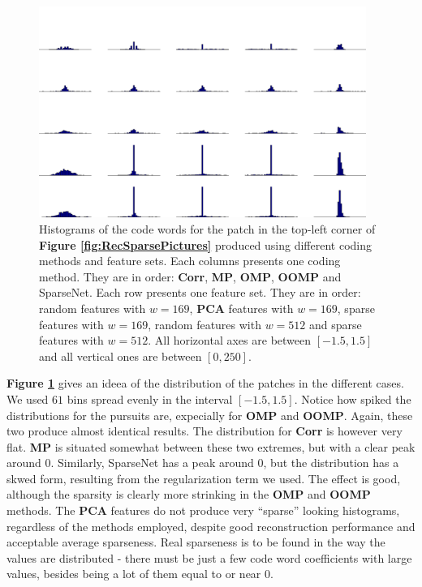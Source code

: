 \documentclass[12pt,a4paper,oneside,english]{UPBThesis}
\begin{document}
\begin{figure}
\centering
\includegraphics[width=0.95\textwidth,height=0.8\textheight]{thesis_data/recsparse/rec_hists.png}
\caption{Histograms of the code words for the patch in the top-left corner of \textbf{Figure \ref{fig:RecSparsePictures}} produced using different coding methods and feature sets. Each columns presents one coding method. They are in order: \textbf{Corr}, \textbf{MP}, \textbf{OMP}, \textbf{OOMP} and SparseNet. Each row presents one feature set. They are in order: random features with $w=169$, \textbf{PCA} features with $w=169$, sparse features with $w=169$, random features with $w=512$ and sparse features with $w=512$. All horizontal axes are between $[-1.5,1.5]$ and all vertical ones are between $[0,250]$.}
\label{fig:RecSparseHists}
\end{figure}

\textbf{Figure \ref{fig:RecSparseHists}} gives an ideea of the distribution of the patches in the different cases. We used $61$ bins spread evenly in the interval $[-1.5,1.5]$. Notice how spiked the distributions for the pursuits are, expecially for \textbf{OMP} and \textbf{OOMP}. Again, these two produce almost identical results. The distribution for \textbf{Corr} is however very flat. \textbf{MP} is situated somewhat between these two extremes, but with a clear peak around $0$. Similarly, SparseNet has a peak around $0$, but the distribution has a skwed form, resulting from the regularization term we used. The effect is good, although the sparsity is clearly more strinking in the \textbf{OMP} and \textbf{OOMP} methods. The \textbf{PCA} features do not produce very ``sparse'' looking histograms, regardless of the methods employed, despite good reconstruction performance and acceptable average sparseness. Real sparseness is to be found in the way the values are distributed - there must be just a few code word coefficients with large values, besides being a lot of them equal to or near $0$.
\end{document}
